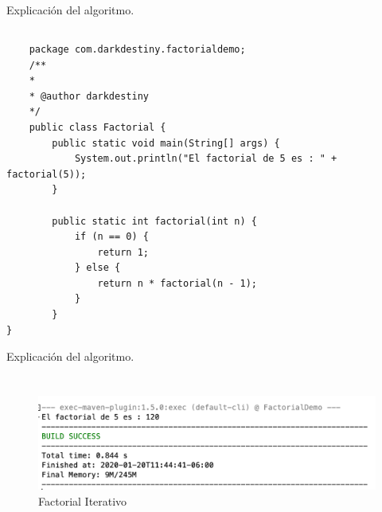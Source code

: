\documentclass[10pt,a4paper]{article}
\begin{document}
{\bfseries\itshape\color{colorESCOM}{Algoritmo:}} Explicación del algoritmo.

\pagebreak

\subsection{
	\textit{
		\color{colorESCOM}{Factorial.java }
	}
}
\lipsum[2-3]
\hfill \break

\begin{lstlisting}
	package com.darkdestiny.factorialdemo;
	/**
	*
	* @author darkdestiny
	*/
	public class Factorial {
		public static void main(String[] args) {
			System.out.println("El factorial de 5 es : " + factorial(5));
		}

		public static int factorial(int n) {
			if (n == 0) {
				return 1;
			} else {
				return n * factorial(n - 1);
			}
		}
}
\end{lstlisting} \hfill

{\bfseries\itshape\color{colorESCOM}{Algoritmo:}}Explicación del algoritmo.

\pagebreak

\section{\color{colorIPN}{Resultados}}

\lipsum[2-3]
\subsection{	\color{colorESCOM}{Ejecución del Programa }}

\subsubsection{\textit{ \color{colorESCOM}{Factorial Iterativo }}}
\lipsum[2-3]


\begin{figure}[H]
	\includegraphics[scale=.54]{factorialIterativo.png}
	\centering \linebreak \linebreak 
	\caption{Factorial Iterativo}
	\label{img:factorialIterativo}
\end{figure} \hfill 
\pagebreak
\end{document}
